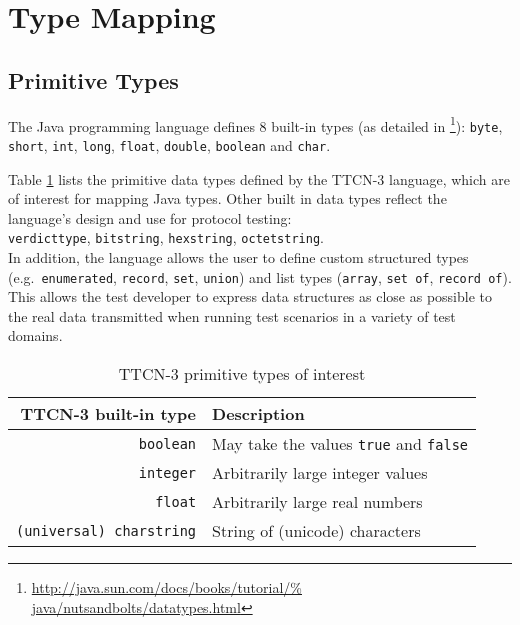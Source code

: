 \section{Type Mapping}
\label{sec:type-mapping}


\subsection{Primitive Types}
\label{sec:type-mapping-primitive-types}

The Java programming language defines 8 built-in types
(as detailed in \citep{website:learning-java}%
\footnote{\url{http://java.sun.com/docs/books/tutorial/%
	java/nutsandbolts/datatypes.html}}):
\verb=byte=, \verb=short=, \verb=int=, \verb=long=,
\verb=float=, \verb=double=, \verb=boolean= and \verb=char=.

Table \ref{tab:ttcn3-prim-types} lists
the primitive data types defined by the \ac{TTCN-3} language,
which are of interest for mapping Java types.
Other built in data types reflect the language's design and use
for protocol testing:\\
\verb=verdicttype=, \verb=bitstring=, \verb=hexstring=, \verb=octetstring=.\\
In addition, the language allows the user to define custom
structured types
(e.g.\ \verb=enumerated=, \verb=record=, \verb=set=, \verb=union=)
and list types (\verb=array=, \verb=set of=, \verb=record of=).
This allows the test developer to express data structures as close as possible
to the real data transmitted when running test scenarios
in a variety of test domains.

\begin{table}
\centering
\begin{tabular}{| r || l |}
	\hline
	\ac{TTCN-3} built-in type	& Description \\
	\hline
	\verb=boolean=	& May take the values \verb=true= and \verb=false= \\
	\verb=integer=	& Arbitrarily large integer values \\
	\verb=float=	& Arbitrarily large real numbers \\
	\verb=(universal) charstring=	& String of (unicode) characters \\
	\hline
\end{tabular}
\caption{TTCN-3 primitive types of interest\label{tab:ttcn3-prim-types}}
\end{table}

